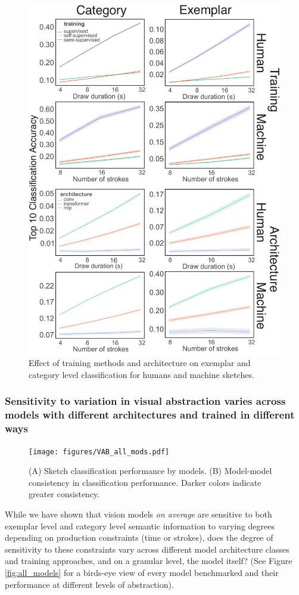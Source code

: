 \documentclass[10pt,letterpaper]{article}
\begin{document}
\begin{figure}[ht!]
    \centering
    \includegraphics[width=.48\textwidth]{figures/VAB_train_arch.pdf}
    \vspace{-2em}
    \caption{Effect of training methods and architecture on exemplar and category level classification for humans and machine sketches.}
    \label{fig:train_arch}
    \vspace{-1em}
\end{figure}

\subsubsection{Sensitivity to variation in visual abstraction varies across models with different architectures and trained in different ways}
\begin{figure}
    \centering
    \texttt{[image: figures/VAB\_all\_mods.pdf]}
    \vspace{-0.5em}
    \caption{(A) Sketch classification performance by models. (B) Model-model consistency in classification performance. Darker colors indicate greater consistency.}
    \label{fig:all_mods}
    \vspace{-1.5em}
\end{figure}

While we have shown that vision models \textit{on average} are sensitive to both exemplar level and category level semantic information to varying degrees depending on production constraints (time or strokes), does the degree of sensitivity to these constraints vary across different model architecture classes and training approaches, and on a granular level, the model itself? (See Figure \ref{fig:all_models} for a birds-eye view of every model benchmarked and their performance at different levels of abstraction).
\end{document}
